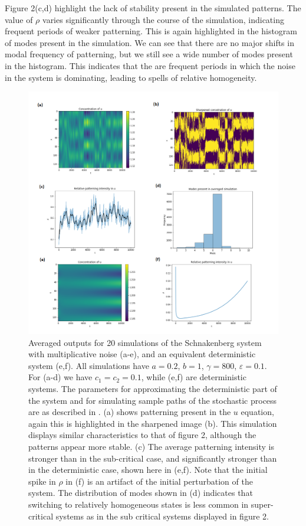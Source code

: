 \documentclass[12pt]{article}
\begin{document}
Figure 2(c,d) highlight the lack of stability present in the simulated patterns. The value of $\rho$ varies significantly through the course of the simulation, indicating frequent periods of weaker patterning. This is again highlighted in the histogram of modes present in the simulation. We can see that there are no major shifts in modal frequency of patterning, but we still see a wide number of modes present in the histogram. This indicates that the are frequent periods in which the noise in the system is dominating, leading to spells of relative homogeneity.

\begin{center}
\begin{figure}
  \includegraphics[scale = 0.65]{Fig_3.png}
  \caption{Averaged outputs for 20 simulations of the Schnakenberg system with multiplicative noise (a-e), and an equivalent deterministic system (e,f). All simulations have $a = 0.2$, $b = 1$, $\gamma = 800$, $\varepsilon = 0.1$. For (a-d) we have $c_1 = c_2= 0.1$, while (e,f) are deterministic systems. The parameters for approximating the deterministic part of the system and for simulating sample paths of the stochastic process are as described in . (a) shows patterning present in the $u$ equation, again this is highlighted in the sharpened image (b). This simulation displays similar characteristics to that of figure 2, although the patterns appear more stable. (c) The average patterning intensity is stronger than in the sub-critical case, and significantly stronger than in the deterministic case, shown here in (e,f). Note that the initial spike in $\rho$ in (f) is an artifact of the initial perturbation of the system. The distribution of modes shown in (d) indicates that switching to relatively homogeneous states is less common in super-critical systems as in the sub critical systems displayed in figure 2.}
\end{figure}
\end{center}
\end{document}
